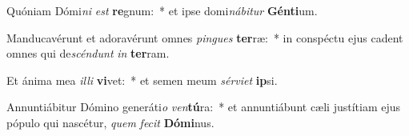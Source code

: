 \item Quóniam Dómi\textit{ni} \textit{est} \textbf{re}gnum:~* et ipse domi\textit{ná}\textit{bi}\textit{tur} \textbf{Gén}\textbf{ti}um.
\item Manducavérunt et adoravérunt omnes \textit{pin}\textit{gues} \textbf{ter}ræ:~* in conspéctu ejus cadent omnes qui de\textit{scén}\textit{dunt} \textit{in} \textbf{ter}ram.
\item Et ánima mea \textit{il}\textit{li} \textbf{vi}vet:~* et semen meum \textit{sér}\textit{vi}\textit{et} \textbf{ip}si.
\item Annuntiábitur Dómino generáti\textit{o} \textit{ven}\textbf{tú}ra:~* et annuntiábunt cæli justítiam ejus pópulo qui nascétur, \textit{quem} \textit{fe}\textit{cit} \textbf{Dó}\textbf{mi}nus.
